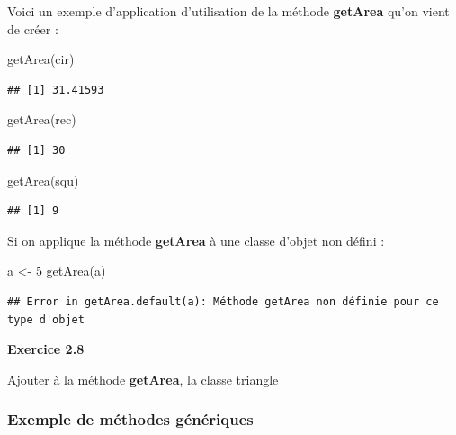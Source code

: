 \documentclass[
]{book}
\newenvironment{Shaded}{\begin{snugshade}}{\end{snugshade}}
\newcommand{\DecValTok}[1]{\textcolor[rgb]{0.00,0.00,0.81}{#1}}
\newcommand{\FunctionTok}[1]{\textcolor[rgb]{0.00,0.00,0.00}{#1}}
\newcommand{\NormalTok}[1]{#1}
\newcommand{\OtherTok}[1]{\textcolor[rgb]{0.56,0.35,0.01}{#1}}
\theoremstyle{definition}
\theoremstyle{definition}
\theoremstyle{definition}
\theoremstyle{definition}
\theoremstyle{remark}
\begin{document}
Voici un exemple d'application d'utilisation de la méthode \textbf{getArea} qu'on vient de créer :

\begin{Shaded}
\begin{Highlighting}[]
\FunctionTok{getArea}\NormalTok{(cir)}
\end{Highlighting}
\end{Shaded}

\begin{verbatim}
## [1] 31.41593
\end{verbatim}

\begin{Shaded}
\begin{Highlighting}[]
\FunctionTok{getArea}\NormalTok{(rec)}
\end{Highlighting}
\end{Shaded}

\begin{verbatim}
## [1] 30
\end{verbatim}

\begin{Shaded}
\begin{Highlighting}[]
\FunctionTok{getArea}\NormalTok{(squ)}
\end{Highlighting}
\end{Shaded}

\begin{verbatim}
## [1] 9
\end{verbatim}

Si on applique la méthode \textbf{getArea} à une classe d'objet non défini :

\begin{Shaded}
\begin{Highlighting}[]
\NormalTok{a }\OtherTok{\textless{}{-}} \DecValTok{5}
\FunctionTok{getArea}\NormalTok{(a)}
\end{Highlighting}
\end{Shaded}

\begin{verbatim}
## Error in getArea.default(a): Méthode getArea non définie pour ce type d'objet
\end{verbatim}

\textbf{Exercice 2.8}

Ajouter à la méthode \textbf{getArea}, la classe triangle

\hypertarget{exemple-de-muxe9thodes-guxe9nuxe9riques}{%
\subsubsection{Exemple de méthodes génériques}\label{exemple-de-muxe9thodes-guxe9nuxe9riques}}
\end{document}
